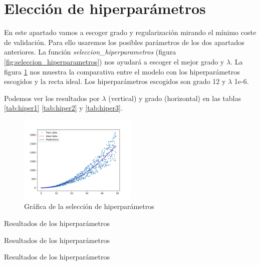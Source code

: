 \documentclass[6pt]{AiTex}
\begin{document}
\section{Elección de hiperparámetros}

En este apartado vamos a escoger grado y regularización mirando el mínimo coste de validación. Para ello usaremos los posibles parámetros de los dos apartados anteriores. La función \textit{seleccion\_hiperparametros} (figura \ref{fig:seleccion_hiperparametros}) nos ayudará a escoger el mejor grado y $\lambda$. La figura \ref{fig:seleccion_hiperparametros_plot} nos muestra la comparativa entre el modelo con los hiperparámetros escogidos y la recta ideal. Los hiperparámetros escogidos son grado 12 y $\lambda$ 1e-6.

Podemos ver los resultados por $\lambda$ (vertical) y grado (horizontal) en las tablas \ref{tab:hiper1} \ref{tab:hiper2} y \ref{tab:hiper3}.

\begin{figure}[H]
    \centering
    \includegraphics[width=0.5\textwidth]{./images/hiperparametros.png}
    \caption{Gráfica de la selección de hiperparámetros}
    \label{fig:seleccion_hiperparametros_plot}
\end{figure}

\begin{table}[H]
    \centering
    \caption{Resultados de los hiperparámetros}
    \label{tab:hiper1}
\end{table}

\begin{table}[H]
    \centering
    \caption{Resultados de los hiperparámetros}
    \label{tab:hiper2}
\end{table}

\begin{table}[H]
    \centering
    \caption{Resultados de los hiperparámetros}
    \label{tab:hiper3}
\end{table}
\end{document}
